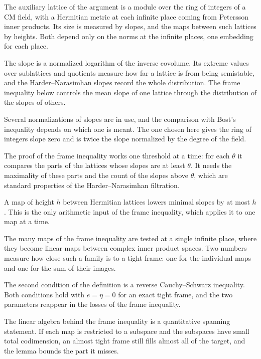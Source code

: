 The auxiliary lattice of the argument is a module over the ring of integers of a CM field, with
a Hermitian metric at each infinite place coming from Petersson inner products. Its size is
measured by slopes, and the maps between such lattices by heights. Both depend only on the norms
at the infinite places, one embedding for each place.

The slope is a normalized logarithm of the inverse covolume. Its extreme values over
sublattices and quotients measure how far a lattice is from being semistable, and the
Harder--Narasimhan slopes record the whole distribution. The frame inequality below controls
the mean slope of one lattice through the distribution of the slopes of others.

Several normalizations of slopes are in use, and the comparison with Bost's inequality depends
on which one is meant. The one chosen here gives the ring of integers slope zero and is twice the
slope normalized by the degree of the field.

The proof of the frame inequality works one threshold at a time: for each $\theta$ it compares
the parts of the lattices whose slopes are at least $\theta$. It needs the maximality of these
parts and the count of the slopes above $\theta$, which are standard properties of the
Harder--Narasimhan filtration.

A map of height $h$ between Hermitian lattices lowers minimal slopes by at most $h$. This is the
only arithmetic input of the frame inequality, which applies it to one map at a time.

The many maps of the frame inequality are tested at a single infinite place, where they become
linear maps between complex inner product spaces. Two numbers measure how close such a family
is to a tight frame: one for the individual maps and one for the sum of their images.

The second condition of the definition is a reverse Cauchy--Schwarz inequality. Both conditions
hold with $e=\eta=0$ for an exact tight frame, and the two parameters reappear in the losses of
the frame inequality.

The linear algebra behind the frame inequality is a quantitative spanning statement. If each map
is restricted to a subspace and the subspaces have small total codimension, an almost tight
frame still fills almost all of the target, and the lemma bounds the part it misses.


